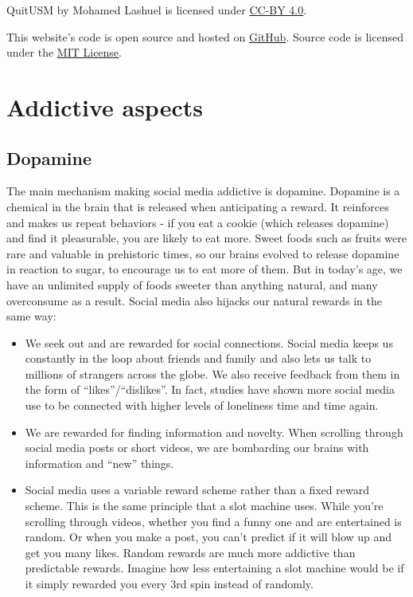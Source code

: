 \documentclass[
]{book}
\providecommand{\tightlist}{%
  \setlength{\itemsep}{0pt}\setlength{\parskip}{0pt}}
\begin{document}
QuitUSM by Mohamed Lashuel is licensed under \href{ttps://creativecommons.org/licenses/by/4.0/}{CC-BY 4.0}.

This website's code is open source and hosted on \href{https://github.com/MohamedLashuel/QuitUSM/}{GitHub}. Source code is licensed under the \href{https://github.com/MohamedLashuel/QuitUSM/blob/main/LICENSE}{MIT License}.

\chapter{Addictive aspects}\label{why-addictive}

\section{Dopamine}\label{dopamine}

The main mechanism making social media addictive is dopamine. Dopamine is a chemical in the brain that is released when anticipating a reward. It reinforces and makes us repeat behaviors - if you eat a cookie (which releases dopamine) and find it pleasurable, you are likely to eat more. Sweet foods such as fruits were rare and valuable in prehistoric times, so our brains evolved to release dopamine in reaction to sugar, to encourage us to eat more of them. But in today's age, we have an unlimited supply of foods sweeter than anything natural, and many overconsume as a result. Social media also hijacks our natural rewards in the same way:

\begin{itemize}
\tightlist
\item
  We seek out and are rewarded for social connections. Social media keeps us constantly in the loop about friends and family and also lets us talk to millions of strangers across the globe. We also receive feedback from them in the form of ``likes''/``dislikes''. In fact, studies have shown more social media use to be connected with higher levels of loneliness time and time again.
\item
  We are rewarded for finding information and novelty. When scrolling through social media posts or short videos, we are bombarding our brains with information and ``new'' things.
\item
  Social media uses a variable reward scheme rather than a fixed reward scheme. This is the same principle that a slot machine uses. While you're scrolling through videos, whether you find a funny one and are entertained is random. Or when you make a post, you can't predict if it will blow up and get you many likes. Random rewards are much more addictive than predictable rewards. Imagine how less entertaining a slot machine would be if it simply rewarded you every 3rd spin instead of randomly.
\end{itemize}
\end{document}
